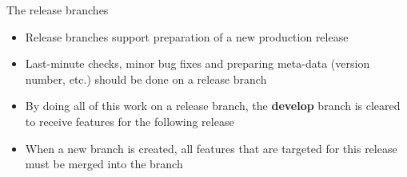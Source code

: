 \documentclass[usenames,svgnames,14pt]{beamer}
\begin{document}
\begin{frame}[fragile,c]{The release branches}
\begin{onlyenv}
\begin{minipage}[c]{0.95\textwidth}
            \setlength{\leftmargini}{1mm}
            \begin{itemize}
                \setlength{\itemsep}{3mm}
                \item Release branches support preparation of a new production release
                \item Last-minute checks, minor bug fixes and preparing meta-data (version number,
                etc.) should be done on a release branch
                \item By doing all of this work on a release branch, the \textbf{develop}
                branch is cleared to receive features for the following release
                \item \alert{When a new  branch is created, all features that are
                    targeted for this release must be merged into the  branch}
            \end{itemize}
        \end{minipage}
    \end{onlyenv}
\end{frame}
\end{document}
